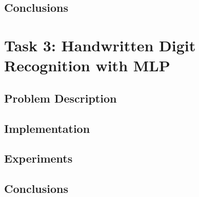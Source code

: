 \documentclass{article}
\begin{document}
\subsection{Conclusions}

\newpage
\section{Task 3: Handwritten Digit Recognition with MLP}
\subsection{Problem Description}

\subsection{Implementation}

\subsection{Experiments}

\subsection{Conclusions}
\end{document}
